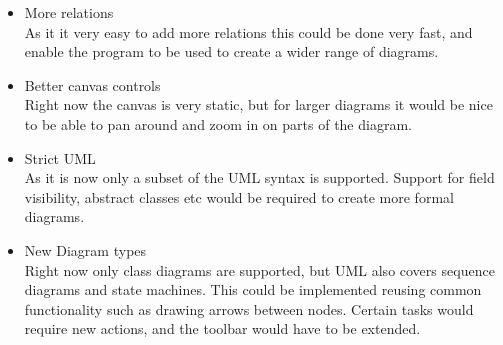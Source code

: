 \begin{itemize}
		\item More relations\\As it it very easy to add more relations this
				could be done very fast, and enable the program to be used to
				create a wider range of diagrams.

		\item Better canvas controls\\Right now the canvas is very static, but
				for larger diagrams it would be nice to be able to pan around
				and zoom in on parts of the diagram.

		\item Strict UML\\As it is now only a subset of the UML syntax is
				supported. Support for field visibility, abstract classes etc
				would be required to create more formal diagrams.
		\item New Diagram types\\Right now only class diagrams are supported,
				but UML also covers sequence diagrams and state machines. This
				could be implemented reusing common functionality such as
				drawing arrows between nodes. Certain tasks would require new
				actions, and the toolbar would have to be extended.
\end{itemize}
